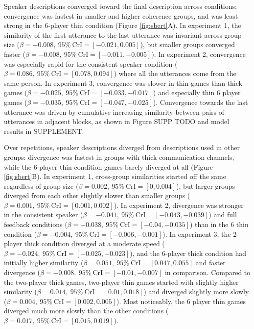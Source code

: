 \documentclass[
  english,
  a4paper,
]{article}
\begin{document}
Speaker descriptions converged toward the final description across conditions; convergence was fastest in smaller and higher coherence groups, and was least strong in the 6-player thin condition (Figure \ref{fig:sbert}A). In experiment 1, the similarity of the first utterance to the last utterance was invariant across group size (\(\beta=-0.008,\:95\%\:\mathrm{CrI}=[-0.021, 0.005]\)), but smaller groups converged faster (\(\beta=-0.008,\:95\%\:\mathrm{CrI}=[-0.011, -0.005]\)). In experiment 2, convergence was especially rapid for the consistent speaker condition (\(\beta=0.086,\:95\%\:\mathrm{CrI}=[0.078, 0.094]\)) where all the utterances come from the same person. In experiment 3, convergence was slower in thin games than thick games (\(\beta=-0.025,\:95\%\:\mathrm{CrI}=[-0.033, -0.017]\)) and especially thin 6 player games (\(\beta=-0.035,\:95\%\:\mathrm{CrI}=[-0.047, -0.025]\)). Convergence towards the last utterance was driven by cumulative increasing similarity between pairs of utterances in adjacent blocks, as shown in Figure SUPP TODO and model results in SUPPLEMENT.

Over repetitions, speaker descriptions diverged from descriptions used in other groups: divergence was fastest in groups with thick communication channels, while the 6-player thin condition games barely diverged at all (Figure \ref{fig:sbert}B). In experiment 1, cross-group similarities started off the same regardless of group size (\(\beta=0.002,\:95\%\:\mathrm{CrI}=[0, 0.004]\)), but larger groups diverged from each other slightly slower than smaller groups (\(\beta=0.001,\:95\%\:\mathrm{CrI}=[0.001, 0.002]\)). In experiment 2, divergence was stronger in the consistent speaker (\(\beta=-0.041,\:95\%\:\mathrm{CrI}=[-0.043, -0.039]\)) and full feedback conditions (\(\beta=-0.038,\:95\%\:\mathrm{CrI}=[-0.04, -0.035]\)) than in the 6 thin condition (\(\beta=-0.004,\:95\%\:\mathrm{CrI}=[-0.006, -0.001]\)). In experiment 3, the 2-player thick condition diverged at a moderate speed (\(\beta=-0.024,\:95\%\:\mathrm{CrI}=[-0.025, -0.023]\)), and the 6-player thick condition had initially higher similarity (\(\beta=0.051,\:95\%\:\mathrm{CrI}=[0.047, 0.055]\) and faster divergence (\(\beta=-0.008,\:95\%\:\mathrm{CrI}=[-0.01, -0.007]\) in comparison. Compared to the two-player thick games, two-player thin games started with slightly higher similarity (\(\beta=0.014,\:95\%\:\mathrm{CrI}=[0.01, 0.018]\)) and diverged slightly more slowly (\(\beta=0.004,\:95\%\:\mathrm{CrI}=[0.002, 0.005]\)). Most noticeably, the 6 player thin games diverged much more slowly than the other conditions (\(\beta=0.017,\:95\%\:\mathrm{CrI}=[0.015, 0.019]\)).
\end{document}

